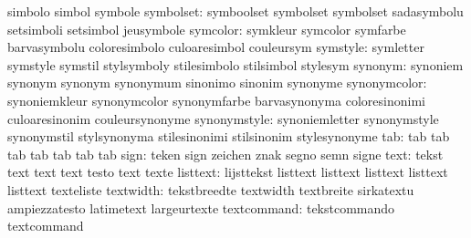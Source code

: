                            simbolo                   simbol
                           symbole
                symbolset: symboolset                symbolset
                           symbolset                 sadasymbolu
                           setsimboli                setsimbol
                           jeusymbole
                 symcolor: symkleur                  symcolor
                           symfarbe                  barvasymbolu
                           coloresimbolo             culoaresimbol
                           couleursym
                 symstyle: symletter                 symstyle
                           symstil                   stylsymboly
                           stilesimbolo              stilsimbol
                           stylesym
                  synonym: synoniem                  synonym
                           synonym                   synonymum
                           sinonimo                  sinonim
                           synonyme
             synonymcolor: synoniemkleur             synonymcolor
                           synonymfarbe              barvasynonyma
                           coloresinonimi            culoaresinonim
                           couleursynonyme
             synonymstyle: synoniemletter            synonymstyle
                           synonymstil               stylsynonyma
                           stilesinonimi             stilsinonim
                           stylesynonyme
                      tab: tab                       tab
                           tab                       tab
                           tab                       tab
                           tab
                     sign: teken                     sign
                           zeichen                   znak
                           segno                     semn
                           signe
                     text: tekst                     text
                           text                      text
                           testo                     text
                           texte
                 listtext: lijsttekst                listtext
                           listtext                  listtext
                           listtext                  listtext
                           texteliste
                textwidth: tekstbreedte              textwidth
                           textbreite                sirkatextu
                           ampiezzatesto             latimetext
                           largeurtexte
              textcommand: tekstcommando             textcommand
